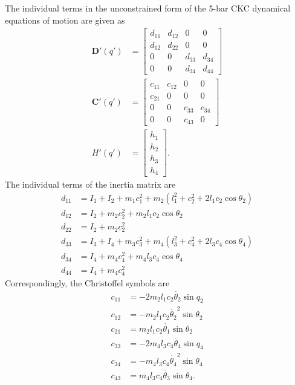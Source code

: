 \documentclass[10pt,final,journal,letterpaper,oneside,twocolumn]{IEEEtran}
\begin{document}
The individual terms in the unconstrained form of the 5-bar CKC
dynamical equations of motion are given as
\begin{align}
  \bm{D}'(q') &= \begin{bmatrix} d_{11} & d_{12} & 0 & 0\\
    d_{12} & d_{22} & 0 & 0\\ 0 & 0 & d_{33} & d_{34}\\
    0 & 0 & d_{34} & d_{44} \end{bmatrix}\nonumber\\
  \bm{C}'(q') &= \begin{bmatrix} c_{11} & c_{12} & 0 & 0\\
    c_{21} & 0 & 0 & 0\\ 0 & 0 & c_{33} & c_{34}\\
    0 & 0 & c_{43} & 0 \end{bmatrix}\nonumber\\
  H'(q') &= \begin{bmatrix} h_1\\ h_2\\ h_3\\ h_4 \end{bmatrix}.
  \label{eq:eomform}
\end{align}
The individual terms of the inertia matrix are
\begin{align}
  d_{11} &= I_1+I_2+m_1c_1^2 + m_2(l_1^2 + c_2^2 +
           2l_1c_2\cos\theta_2)\nonumber\\
  d_{12} &= I_2+m_2c_2^2+m_2l_1c_2\cos\theta_2\nonumber\\
  d_{22} &= I_2+m_2c_2^2\nonumber\\
  d_{33} &= I_3+I_4+m_3c_3^2 + m_4(l_3^2 + c_4^2 +
           2l_3c_4\cos\theta_4)\nonumber\\
  d_{34} &= I_4+m_4c_4^2+m_4l_3c_4\cos\theta_4\nonumber\\
  d_{44} &= I_4+m_4c_4^2  
  \label{eq:inertterms}
\end{align}
Correspondingly, the Christoffel symbols are
\begin{align}
  c_{11} &= -2m_2l_1c_2\dot{\theta_2}\sin q_2\nonumber\\
  c_{12} &= -m_2l_1c_2\dot{\theta_2}^2\sin\theta_2\nonumber\\
  c_{21} &= m_2l_1c_2\dot{\theta_1}\sin\theta_2\nonumber\\
  c_{33} &= -2m_4l_3c_4\dot{\theta_4}\sin q_4\nonumber\\
  c_{34} &= -m_4l_3c_4\dot{\theta_4}^2\sin\theta_4\nonumber\\
  c_{43} &= m_4l_3c_4\dot{\theta_3}\sin\theta_4.
  \label{eq:csymbterms}
\end{align}
\end{document}
